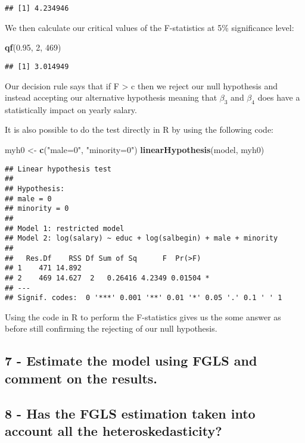 \documentclass[
]{article}
\newenvironment{Shaded}{\begin{snugshade}}{\end{snugshade}}
\newcommand{\DecValTok}[1]{\textcolor[rgb]{0.00,0.00,0.81}{#1}}
\newcommand{\FloatTok}[1]{\textcolor[rgb]{0.00,0.00,0.81}{#1}}
\newcommand{\FunctionTok}[1]{\textcolor[rgb]{0.13,0.29,0.53}{\textbf{#1}}}
\newcommand{\NormalTok}[1]{#1}
\newcommand{\OtherTok}[1]{\textcolor[rgb]{0.56,0.35,0.01}{#1}}
\newcommand{\StringTok}[1]{\textcolor[rgb]{0.31,0.60,0.02}{#1}}
\begin{document}
\begin{verbatim}
## [1] 4.234946
\end{verbatim}

We then calculate our critical values of the F-statistics at 5\%
significance level:

\begin{Shaded}
\begin{Highlighting}[]
\FunctionTok{qf}\NormalTok{(}\FloatTok{0.95}\NormalTok{, }\DecValTok{2}\NormalTok{, }\DecValTok{469}\NormalTok{)}
\end{Highlighting}
\end{Shaded}

\begin{verbatim}
## [1] 3.014949
\end{verbatim}

Our decision rule says that if F \textgreater{} c then we reject our
null hypothesis and instead accepting our alternative hypothesis meaning
that \(\beta_3\) and \(\beta_4\) does have a statistically impact on
yearly salary.

It is also possible to do the test directly in R by using the following
code:

\begin{Shaded}
\begin{Highlighting}[]
\NormalTok{myh0 }\OtherTok{\textless{}{-}} \FunctionTok{c}\NormalTok{(}\StringTok{"male=0"}\NormalTok{, }\StringTok{"minority=0"}\NormalTok{)}
\FunctionTok{linearHypothesis}\NormalTok{(model, myh0)}
\end{Highlighting}
\end{Shaded}

\begin{verbatim}
## Linear hypothesis test
## 
## Hypothesis:
## male = 0
## minority = 0
## 
## Model 1: restricted model
## Model 2: log(salary) ~ educ + log(salbegin) + male + minority
## 
##   Res.Df    RSS Df Sum of Sq      F  Pr(>F)  
## 1    471 14.892                              
## 2    469 14.627  2   0.26416 4.2349 0.01504 *
## ---
## Signif. codes:  0 '***' 0.001 '**' 0.01 '*' 0.05 '.' 0.1 ' ' 1
\end{verbatim}

Using the code in R to perform the F-statistics gives us the some answer
as before still confirming the rejecting of our null hypothesis.

\subsection{7 - Estimate the model using FGLS and comment on the
results.}\label{estimate-the-model-using-fgls-and-comment-on-the-results.}

\subsection{8 - Has the FGLS estimation taken into account all the
heteroskedasticity?}\label{has-the-fgls-estimation-taken-into-account-all-the-heteroskedasticity}
\end{document}
